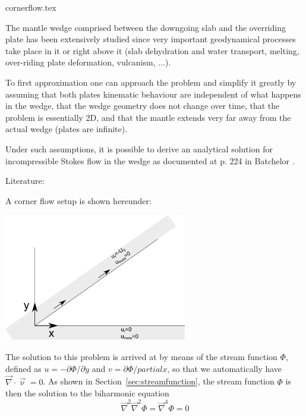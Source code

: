 \begin{flushright} {\tiny {\color{gray} cornerflow.tex}} \end{flushright}

The mantle wedge comprised between the downgoing slab and the overriding plate
has been extensively studied since very important geodynamical processes take place
in it or right above it (slab dehydration and water transport, melting, over-riding plate
deformation, vulcanism, ...).

To first approximation one can approach the problem and simplify it greatly by 
assuming that both plates kinematic behaviour are independent of what happens 
in the wedge, that the wedge geometry does not change over time, that the problem 
is essentially 2D, and that the mantle extends very far away from the actual 
wedge (plates are infinite). 

Under such assumptions, it is possible to derive an analytical solution 
for incompressible Stokes flow in the wedge as documented at p. 224 in  Batchelor \cite{batchelor}.

Literature: \cite{tosl78}


A corner flow setup is shown hereunder:
\begin{center}
\includegraphics[width=8cm]{images/cornerflow/corner}
\end{center}

 
The solution to this problem is arrived at by means of the stream function $\Phi$, defined 
as $u=-\partial \Phi/\partial y$ and $v=\partial \Phi/partial x$, so that we automatically have $\vec\nabla\cdot\vec\upnu=0$.
As shown in Section~\ref{sec:streamfunction}, the stream function $\Phi$ is then the solution to 
the biharmonic equation
\[
\vec\nabla^2 \vec\nabla^2 \Phi = \vec\nabla^4 \Phi = 0
\]

